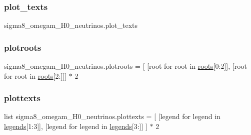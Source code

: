 \mbox{\label{namespacesigma8__omegam__H0__neutrinos_a32c17a221fe8b0e2f8179d263eb9c759}} 
\subsubsection{\texorpdfstring{plot\+\_\+texts}{plot\_texts}}
{\footnotesize\ttfamily sigma8\+\_\+omegam\+\_\+\+H0\+\_\+neutrinos.\+plot\+\_\+texts}

\mbox{\label{namespacesigma8__omegam__H0__neutrinos_a14654c3738c8a535ee0fe6025521cbbf}} 
\subsubsection{\texorpdfstring{plotroots}{plotroots}}
{\footnotesize\ttfamily sigma8\+\_\+omegam\+\_\+\+H0\+\_\+neutrinos.\+plotroots = \mbox{[} \mbox{[}root for root in \mbox{\hyperlink{namespacesigma8__omegam__H0__neutrinos_ad26beb5cf572c1b26f7674dddcd76a78}{roots}}\mbox{[}0\+:2\mbox{]}\mbox{]}, \mbox{[}root for root in \mbox{\hyperlink{namespacesigma8__omegam__H0__neutrinos_ad26beb5cf572c1b26f7674dddcd76a78}{roots}}\mbox{[}2\+:\mbox{]}\mbox{]}\mbox{]} $\ast$ 2}

\mbox{\label{namespacesigma8__omegam__H0__neutrinos_a1edcde27e659769d78d150b63c56b901}} 
\subsubsection{\texorpdfstring{plottexts}{plottexts}}
{\footnotesize\ttfamily list sigma8\+\_\+omegam\+\_\+\+H0\+\_\+neutrinos.\+plottexts = \mbox{[} \mbox{[}legend for legend in \mbox{\hyperlink{namespacesigma8__omegam__H0__neutrinos_aea361e871a0ef6fe21cd7907ba18a4e9}{legends}}\mbox{[}1\+:3\mbox{]}\mbox{]}, \mbox{[}legend for legend in \mbox{\hyperlink{namespacesigma8__omegam__H0__neutrinos_aea361e871a0ef6fe21cd7907ba18a4e9}{legends}}\mbox{[}3\+:\mbox{]}\mbox{]} \mbox{]} $\ast$ 2}

